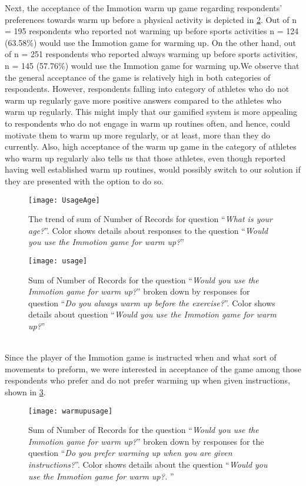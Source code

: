 Next, the acceptance of the Immotion warm up game regarding respondents' preferences towards warm up before a physical activity is depicted in \ref{fig:usage}. Out of n = 195 respondents who reported not warming up before sports activities n = 124 (63.58\%) would use the Immotion game for warming up. On the other hand, out of n = 251 respondents who reported always warming up before sports activities, n = 145 (57.76\%) would use the Immotion game for warming up.We observe that the general acceptance of the game is relatively high in both categories of respondents. However, respondents falling into category of athletes who do not warm up regularly gave more positive answers compared to the athletes who warm up regularly. This might imply that our gamified system is more appealing to respondents who do not engage in warm up routines often, and hence, could motivate them to warm up more regularly, or at least, more than they do currently. Also, high acceptance of the warm up game in the category of athletes who warm up regularly also tells us that those athletes, even though reported having well established warm up routines, would possibly switch to our solution if they are presented with the option to do so.\\
\begin{figure}[h]
    \centering
    \texttt{[image: UsageAge]}
    \caption{The trend of sum of Number of Records for question ``\textit{What is your age?}''. Color shows details about responses to the question ``\textit{Would you use the Immotion game for warm up?}''}
    \label{fig:UsageAge}
\end{figure}
\begin{figure}[h]
    \centering
    \texttt{[image: usage]}
    \caption{Sum of Number of Records for the question ``\textit{Would you use the Immotion game for warm up?}'' broken down by responses for question ``\textit{Do you always warm up before the exercise?}''. Color shows details about question ``\textit{Would you use the Immotion game for warm up?}''}
    \label{fig:usage}
\end{figure}\\
Since the player of the Immotion game is instructed when and what sort of movements to preform, we were interested in acceptance of the game among those respondents who prefer and do not prefer warming up when given instructions, shown in \ref{fig:warmupusage}.
\begin{figure}[h]
    \centering
    \texttt{[image: warmupusage]}
    \caption{Sum of Number of Records for the question ``\textit{Would you use the Immotion game for warm up?}'' broken down by responses for the question ``\textit{Do you prefer warming up when you are given instructions?}''. Color shows details about the question ``\textit{Would you use the Immotion game for warm up?. }''}
    \label{fig:warmupusage}
\end{figure}\\
